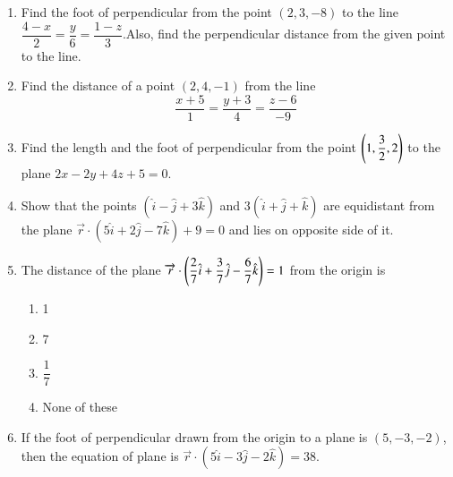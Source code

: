 \begin{enumerate}[label=\thesubsection.\arabic*,ref=\thesubsection.\theenumi]
\item Find the foot of perpendicular from the point $(2,3,-8)$ to the line  $\dfrac{4-x}{2}=\dfrac{y}{6}=\dfrac{1-z}{3}$.Also, find the perpendicular distance from the given point to the line.
\item Find the distance of a point $(2,4,-1)$ from the line $$\frac{x+5}{1}=\frac{y+3}{4}=\frac{z-6}{-9}$$
\item Find the length and the foot of perpendicular from the point $ \left(1,\dfrac{3}{2} ,2 \right)$ to the plane $2x-2y+4z+5=0.$
\item Show that the points $(\hat{i}-\hat{j}+3\hat{k})$ and $3(\hat{i}+\hat{j}+\hat{k})$ are equidistant from the plane $\overrightarrow{r} \cdot (5\hat{i}+2\hat{j}-7\hat{k})+9=0$ and lies on opposite side of it.
\item The distance of the plane $\overrightarrow{r} \cdot \left( \dfrac{2}{7}\hat{i}+\dfrac{3}{7}\hat{j}-\dfrac{6}{7}\hat{k}\right)=1$ from the origin is 
\begin{enumerate}
	\item 1
	\item 7
	\item $\dfrac{1}{7}$
	\item None of these	
\end{enumerate}
\item If the foot of perpendicular drawn from the origin to a plane is $(5,-3,-2)$, then the equation of plane is $\overrightarrow{r} \cdot (5\hat{i}-3\hat{j}-2\hat{k})=38.$
\end{enumerate}
